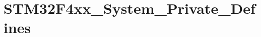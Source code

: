 \hypertarget{group__STM32F4xx__System__Private__Defines}{}\section{S\+T\+M32\+F4xx\+\_\+\+System\+\_\+\+Private\+\_\+\+Defines}
\label{group__STM32F4xx__System__Private__Defines}
